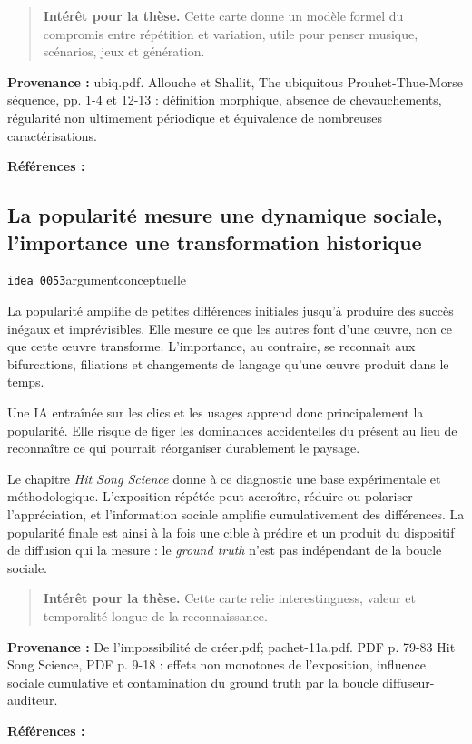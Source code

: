 \documentclass[10pt,a4paper]{article}
\begin{document}
\begin{quote}
\textbf{Intérêt pour la thèse.} Cette carte donne un modèle formel du compromis entre répétition et variation, utile pour penser musique, scénarios, jeux et génération.
\end{quote}
{\footnotesize\color{metadata}\textbf{Provenance :} ubiq.pdf. Allouche et Shallit, The ubiquitous Prouhet-Thue-Morse séquence, pp. 1-4 et 12-13 : définition morphique, absence de chevauchements, régularité non ultimement périodique et équivalence de nombreuses caractérisations.\par}
{\footnotesize\color{metadata}\textbf{Références :} \parencite{allouche1999thueMorse}\par}

\subsection{La popularité mesure une dynamique sociale, l'importance une transformation historique}
{\small\color{metadata} \texttt{idea\_0053}\quad\textbullet\quad argument\quad\textbullet\quad conceptuelle\par}

La popularité amplifie de petites différences initiales jusqu'à produire des succès inégaux et imprévisibles. Elle mesure ce que les autres font d'une œuvre, non ce que cette œuvre transforme. L'importance, au contraire, se reconnait aux bifurcations, filiations et changements de langage qu'une œuvre produit dans le temps.

Une IA entraînée sur les clics et les usages apprend donc principalement la popularité. Elle risque de figer les dominances accidentelles du présent au lieu de reconnaître ce qui pourrait réorganiser durablement le paysage.

Le chapitre \emph{Hit Song Science} donne à ce diagnostic une base expérimentale et méthodologique. L'exposition répétée peut accroître, réduire ou polariser l'appréciation, et l'information sociale amplifie cumulativement des différences. La popularité finale est ainsi à la fois une cible à prédire et un produit du dispositif de diffusion qui la mesure : le \emph{ground truth} n'est pas indépendant de la boucle sociale.

\begin{quote}
\textbf{Intérêt pour la thèse.} Cette carte relie interestingness, valeur et temporalité longue de la reconnaissance.
\end{quote}
{\footnotesize\color{metadata}\textbf{Provenance :} De l'impossibilité de créer.pdf; pachet-11a.pdf. PDF p. 79-83 Hit Song Science, PDF p. 9-18 : effets non monotones de l'exposition, influence sociale cumulative et contamination du ground truth par la boucle diffuseur-auditeur.\par}
{\footnotesize\color{metadata}\textbf{Références :} \parencite{pachet2011hitsong}\par}
\end{document}
